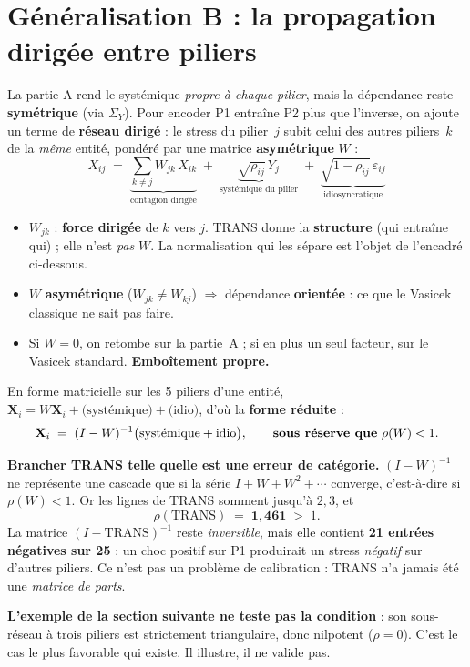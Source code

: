 \documentclass[11pt,a4paper]{article}
\newcommand{\Y}{Y}
\newcommand{\eps}{\varepsilon}
\begin{document}
\section{Généralisation B : la propagation dirigée entre piliers}

La partie A rend le systémique \emph{propre à chaque pilier}, mais la dépendance reste
\textbf{symétrique} (via $\Sigma_Y$). Pour encoder \og{}P1 entraîne P2 plus que l'inverse\fg{},
on ajoute un terme de \textbf{réseau dirigé} : le stress du pilier~$j$ subit celui des autres
piliers~$k$ de la \emph{même} entité, pondéré par une matrice \textbf{asymétrique} $W$ :
\begin{equation}
\boxed{\;X_{ij} \;=\; \underbrace{\sum_{k\neq j} W_{jk}\,X_{ik}}_{\text{contagion dirigée}}
   \;+\; \underbrace{\sqrt{\rho_{ij}}\,\Y_j}_{\text{systémique du pilier}}
   \;+\; \underbrace{\sqrt{1-\rho_{ij}}\,\eps_{ij}}_{\text{idiosyncratique}}\;}
\end{equation}
\begin{itemize}[leftmargin=1.4em,itemsep=1pt]
\item $W_{jk}$ : \textbf{force dirigée} de $k$ vers $j$. TRANS donne la \textbf{structure}
  (qui entraîne qui) ; elle n'est \emph{pas} $W$. La normalisation qui les sépare est
  l'objet de l'encadré ci-dessous.
\item $W$ \textbf{asymétrique} ($W_{jk}\neq W_{kj}$) $\Rightarrow$ dépendance \textbf{orientée} :
  ce que le Vasicek classique ne sait pas faire.
\item Si $W=0$, on retombe sur la partie~A ; si en plus un seul facteur, sur le Vasicek
  standard. \textbf{Emboîtement propre.}
\end{itemize}

\noindent En forme matricielle sur les 5 piliers d'une entité, $\mathbf X_i = W\mathbf X_i +
\text{(systémique)} + \text{(idio)}$, d'où la \textbf{forme réduite} :
\begin{equation}
\mathbf X_i \;=\; (I - W)^{-1}\big(\text{systémique} + \text{idio}\big),
\qquad\text{\textbf{sous réserve que} } \rho(W) < 1 .
\end{equation}

\begin{attention}
\textbf{Brancher TRANS telle quelle est une erreur de catégorie.}
$(I-W)^{-1}$ ne représente une cascade que si la série $I + W + W^2 + \cdots$ converge,
c'est-à-dire si $\rho(W) < 1$. Or les lignes de TRANS somment jusqu'à $2{,}3$, et
\[
\rho(\mathrm{TRANS}) \;=\; \mathbf{1{,}461} \;>\; 1 .
\]
La matrice $(I-\mathrm{TRANS})^{-1}$ reste \emph{inversible}, mais elle contient
\textbf{21 entrées négatives sur 25} : un choc positif sur P1 produirait un stress
\emph{négatif} sur d'autres piliers. Ce n'est pas un problème de calibration : TRANS
n'a jamais été une \emph{matrice de parts}.

\smallskip
\noindent\textbf{L'exemple de la section suivante ne teste pas la condition} : son
sous-réseau à trois piliers est strictement triangulaire, donc nilpotent ($\rho = 0$).
C'est le cas le plus favorable qui existe. Il illustre, il ne valide pas.
\end{attention}
\end{document}
